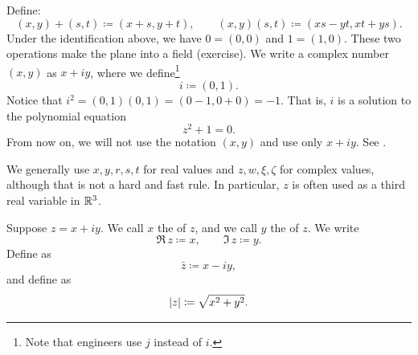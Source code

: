 Define:
\begin{equation*}
(x,y) + (s,t) \coloneqq (x+s,y+t) , \qquad
(x,y) (s,t) \coloneqq (xs-yt,xt+ys) .
\end{equation*}
Under the identification above, we have $0 = (0,0)$ and $1 = (1,0)$.  These
two operations make the plane into a field (exercise).
We write a complex number $(x,y)$ as $x+iy$, where we
define\footnote{Note that engineers use $j$ instead of $i$.}
\begin{equation*}
i \coloneqq (0,1) .
\end{equation*}
Notice that $i^2 = (0,1)(0,1) = (0-1,0+0) = -1$.
That is, $i$ is a solution to the polynomial equation
\begin{equation*}
z^2+1=0 .
\end{equation*}
From now on, we will not use the notation $(x,y)$ and use only $x+iy$.
See .
\begin{myfigureht}
\caption{The points $1$, $i$, $x$, $iy$, and $x+iy$ in the complex
plane.\label{fig:complexplane}}
\end{myfigureht}

We generally use $x,y,r,s,t$ for real values and $z,w,\xi,\zeta$
for complex values, although that is not a hard and fast rule.  In
particular, $z$ is often used as a third real variable in ${\mathbb{R}}^3$.

\begin{defn}
Suppose $z= x+iy$.
We call $x$ 
the \emph{} of $z$, and 
we call $y$
the \emph{} of $z$.  We write
\begin{equation*}
\Re\, z \coloneqq x , \qquad
\Im\, z \coloneqq y .
\end{equation*}
Define 
\emph{} as
\begin{equation*}
\bar{z} \coloneqq x-iy ,
\end{equation*}
and define \emph{} as
\begin{equation*}
\lvert {z} \rvert \coloneqq \sqrt{x^2+y^2} .
\end{equation*}
\end{defn}

